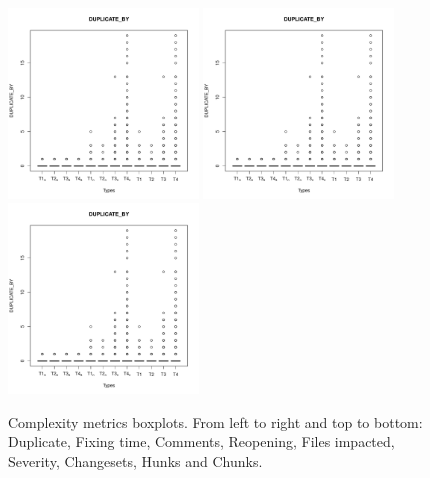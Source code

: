 \begin{figure}
\centering
\includegraphics[page=7, width=0.45\textwidth]{extract/Rplots}
\includegraphics[page=8, width=0.45\textwidth]{extract/Rplots} \\
\includegraphics[page=9, width=0.45\textwidth]{extract/Rplots}

\caption{Complexity metrics boxplots. From left to right and top to bottom: Duplicate, Fixing time, Comments, Reopening, Files impacted, Severity, Changesets, Hunks and Chunks.
\label{fig:boxplots}}

\end{figure}

 


